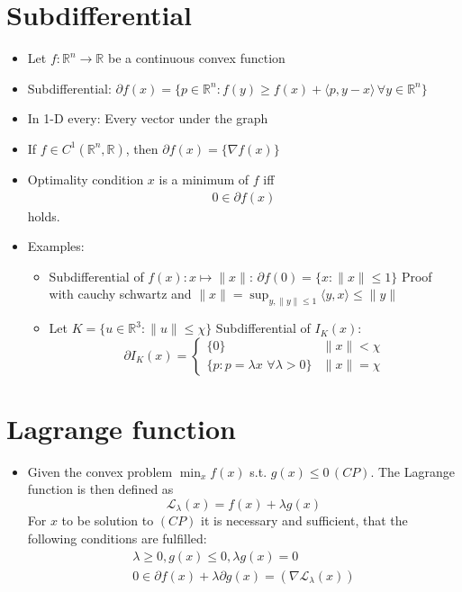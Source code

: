 \documentclass[a4paper,10pt]{article}
\begin{document}
\section{Subdifferential}
 \begin{itemize}
    \item Let $f: \mathbb R^n \to \mathbb R$ be a continuous convex function
    \item Subdifferential: $\partial f(x) = \{p \in \mathbb R^n: f(y) \geq f(x) + \langle p, y - x \rangle \, \forall y \in \mathbb R^n\}$

    \item In 1-D every: Every vector under the graph
    
    \item If $f \in C^1(\mathbb R^n,\mathbb R)$, then $\partial f(x) = \{\nabla f(x)\}$
     \item Optimality condition $x$ is a minimum of $f$ iff \begin{align}
                                                        0 \in \partial f(x)
                                                       \end{align}
        holds.
    \item Examples:
     \begin{itemize}
      \item Subdifferential of $f(x): x \mapsto \|x\|$: $\partial f(0) = \{x : \|x\| \leq 1 \}$
      Proof with cauchy schwartz and $\|x\| = \sup_{y,\|y\| \leq 1} \langle y,x \rangle \leq \|y\|$
      \item Let $K = \{u \in \mathbb R^3 : \|u\| \leq \chi \} $ Subdifferential of $I_K(x):$
      $$\partial I_K(x) = \begin{cases}\{0\} & \|x\| < \chi \\ \{p : p = \lambda x \,\, \forall \lambda > 0 \} & \|x\| = \chi \end{cases}$$
     \end{itemize}



 \end{itemize} 

 
\section{Lagrange function}
 \begin{itemize}
    \item Given the convex problem $\min_x f(x)$ s.t. $g(x) \leq 0 \,(CP)$. The Lagrange function is then defined as
    \begin{equation}
    \mathcal L_\lambda(x) = f(x) + \lambda g(x)
    \end{equation}
    For $x$ to be solution to $(CP)$ it is necessary and sufficient, that the following conditions are fulfilled:
    \begin{align}
        \lambda \geq 0, g(x) \leq 0, \lambda g(x) = 0 \\
        0 \in \partial f(x) + \lambda \partial g(x) = (\nabla \mathcal L_\lambda(x))
    \end{align}
 \end{itemize} 
\end{document}
